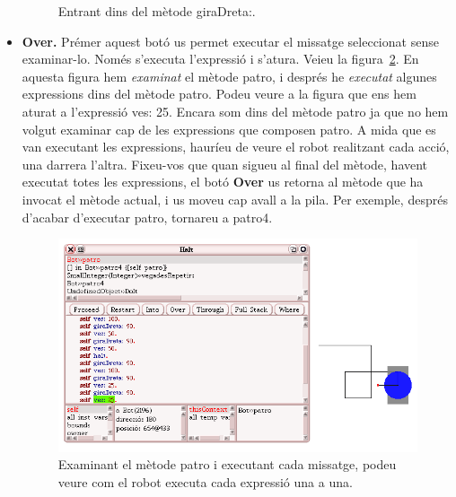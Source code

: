 \begin{itemize}
\begin{figure}[h!]
\begin{center}
\end{center}
\caption{Entrant dins del mètode \textsf{\upshape giraDreta:}.}
\label{fig1506}
\end{figure}
\item[] \textbf{Over.} Prémer aquest botó us permet executar el missatge seleccionat sense examinar-lo. Només s'executa l'expressió i s'atura. Veieu la figura~\ref{fig1507}. En aquesta figura hem \emph{examinat} el mètode \textsf{patro}, i després he \emph{executat} algunes expressions dins del mètode \textsf{patro}. Podeu veure a la figura que ens hem aturat a l'expressió \textsf{ves: 25}. Encara som dins del mètode \textsf{patro} ja que no hem volgut examinar cap de les expressions que composen \textsf{patro}. A mida que es van executant les expressions, hauríeu de veure el robot realitzant cada acció, una darrera l'altra. Fixeu-vos que quan sigueu al final del mètode, havent executat totes les expressions, el botó \textbf{Over} us retorna al mètode que ha invocat el mètode actual, i us moveu cap avall a la pila. Per exemple, després d'acabar d'executar \textsf{patro}, tornareu a \textsf{patro4}. 
\begin{figure}[h!]
\begin{center}
\includegraphics[scale=0.5]{Imatges/figura15-7.png}
\end{center}
\caption{Examinant el mètode \textsf{\upshape patro} i executant cada missatge, podeu veure com el robot executa cada expressió una a una.}
\label{fig1507}
\end{figure}
\end{itemize}

